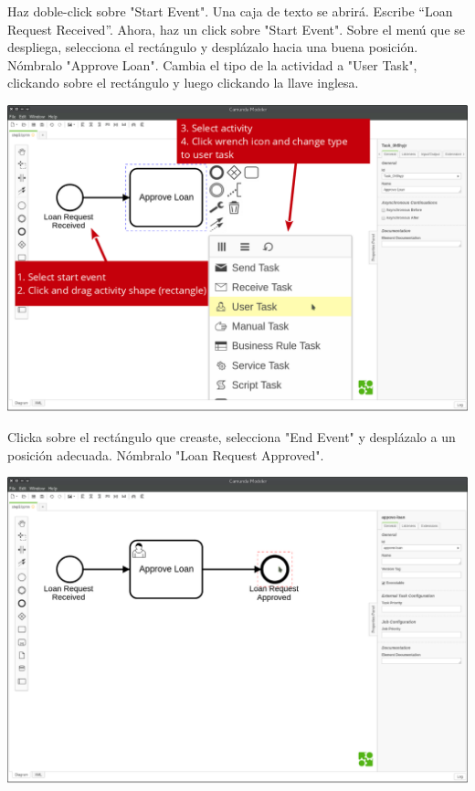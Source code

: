 \documentclass{article}
\begin{document}
Haz doble-click sobre "Start Event". Una caja de texto se abrirá. Escribe “Loan Request Received”. Ahora, haz un click sobre "Start Event". Sobre el menú que se despliega, selecciona el rectángulo y desplázalo hacia una buena posición. Nómbralo "Approve Loan". Cambia el tipo de la actividad a "User Task", clickando sobre el rectángulo y luego clickando la llave inglesa.

\begin{center}
\includegraphics[width=\textwidth]{modeler-step2.png}
\end{center}

Clicka sobre el rectángulo que creaste, selecciona "End Event" y desplázalo a un posición adecuada. Nómbralo "Loan Request Approved".

\begin{center}
\includegraphics[width=\textwidth]{modeler-step3.png}
\end{center}
\end{document}
